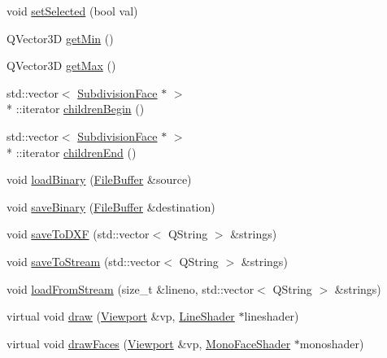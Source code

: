 \begin{DoxyCompactItemize}
void \hyperlink{classShipCADGeometry_1_1SubdivisionControlFace_a2ce580378cd200faec6a24d9d794c68e}{set\-Selected} (bool val)
\item 
Q\-Vector3\-D \hyperlink{classShipCADGeometry_1_1SubdivisionControlFace_a7206287dd23fe07ad6fb929258a15f01}{get\-Min} ()
\item 
Q\-Vector3\-D \hyperlink{classShipCADGeometry_1_1SubdivisionControlFace_a06eea7586cd4971162f6d9bc1d0852d8}{get\-Max} ()
\item 
std\-::vector$<$ \hyperlink{classShipCADGeometry_1_1SubdivisionFace}{Subdivision\-Face} $\ast$ $>$\\*
\-::iterator \hyperlink{classShipCADGeometry_1_1SubdivisionControlFace_ac6efdc9d144af407d9b044d82779f61f}{children\-Begin} ()
\item 
std\-::vector$<$ \hyperlink{classShipCADGeometry_1_1SubdivisionFace}{Subdivision\-Face} $\ast$ $>$\\*
\-::iterator \hyperlink{classShipCADGeometry_1_1SubdivisionControlFace_ac11e1779fe39e51a0fa7ae09165a9902}{children\-End} ()
\item 
void \hyperlink{classShipCADGeometry_1_1SubdivisionControlFace_aa5ba43707787cde6e99cd645708e9200}{load\-Binary} (\hyperlink{classShipCADGeometry_1_1FileBuffer}{File\-Buffer} \&source)
\item 
void \hyperlink{classShipCADGeometry_1_1SubdivisionControlFace_a562b877e868dbd86ffe2c864232e1b78}{save\-Binary} (\hyperlink{classShipCADGeometry_1_1FileBuffer}{File\-Buffer} \&destination)
\item 
void \hyperlink{classShipCADGeometry_1_1SubdivisionControlFace_ab2aaada5c28682e4f17bc47261203cee}{save\-To\-D\-X\-F} (std\-::vector$<$ Q\-String $>$ \&strings)
\item 
void \hyperlink{classShipCADGeometry_1_1SubdivisionControlFace_aa75c77ee2e007015851930a604744aa0}{save\-To\-Stream} (std\-::vector$<$ Q\-String $>$ \&strings)
\item 
void \hyperlink{classShipCADGeometry_1_1SubdivisionControlFace_ae856d93b8844854d908835df1f363ddd}{load\-From\-Stream} (size\-\_\-t \&lineno, std\-::vector$<$ Q\-String $>$ \&strings)
\item 
virtual void \hyperlink{classShipCADGeometry_1_1SubdivisionControlFace_ac253493bccd91108d936b651e72b46f8}{draw} (\hyperlink{classShipCADGeometry_1_1Viewport}{Viewport} \&vp, \hyperlink{classShipCADGeometry_1_1LineShader}{Line\-Shader} $\ast$lineshader)
\item 
virtual void \hyperlink{classShipCADGeometry_1_1SubdivisionControlFace_aef1327fd3e623b190d67dcb461a3e950}{draw\-Faces} (\hyperlink{classShipCADGeometry_1_1Viewport}{Viewport} \&vp, \hyperlink{classShipCADGeometry_1_1MonoFaceShader}{Mono\-Face\-Shader} $\ast$monoshader)

\end{DoxyCompactItemize}
